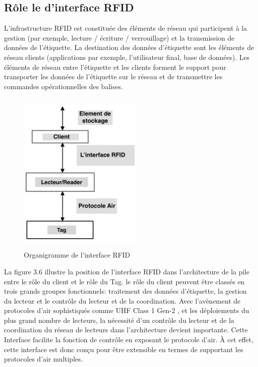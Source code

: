 \documentclass[11pt, a4paper, twoside]{book}
\begin{document}
\subsection{Rôle le d'interface RFID}
L'infrastructure RFID est constituée des éléments de réseau qui participent à la gestion (par exemple, lecture / écriture / verrouillage) et la transmission de données de l'étiquette. La destination des données d'étiquette sont les éléments de réseau clients (applications par exemple, l'utilisateur final, base de données). Les éléments de réseau entre l'étiquette et les clients forment le support pour transporter les données de l'étiquette sur le réseau et de transmettre les commandes opérationnelles des balises.
\begin{figure}[H]
\centering
\includegraphics[width=6cm,height=8cm]{orga}
\caption{Organigramme de l'interface RFID}
\end{figure}

La figure 3.6 illustre la position de l'interface RFID dans l'architecture de la pile entre le  rôle  du client  et le rôle du Tag. le rôle du client peuvent être classés en trois grands groupes fonctionnels: traitement des données d'étiquette, la gestion du lecteur  et le contrôle du lecteur et de la coordination. Avec l'avènement de protocoles d'air sophistiqués comme UHF Class 1 Gen-2 \cite{air}, et les déploiements du plus grand nombre de lecteurs, la nécessité d'un contrôle du lecteur et de la coordination  du réseau de lecteurs dans l'architecture devient importante. Cette Interface  facilite la fonction de contrôle en exposant le protocole d'air. À cet effet, cette interface est donc conçu pour être extensible en termes de supportant les protocoles d'air multiples.\\
\end{document}
